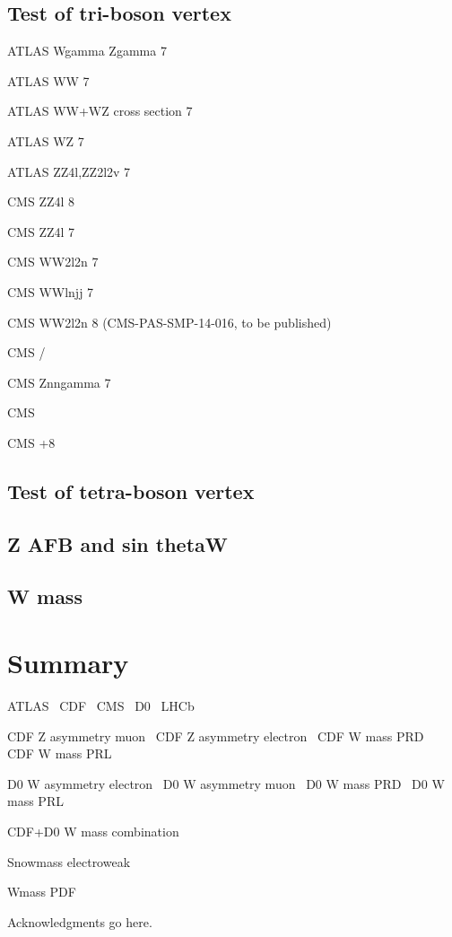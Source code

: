 \documentclass[12pt]{iopart}
\begin{document}
\subsection{Test of tri-boson vertex}

ATLAS Wgamma Zgamma 7 \TeV~\cite{Aad:2013izg}

ATLAS WW 7 \TeV~\cite{ATLAS:2012mec}

ATLAS WW+WZ cross section 7 \TeV~\cite{Aad:2014mda}

ATLAS WZ 7 \TeV~\cite{Aad:2012twa}

ATLAS ZZ4l,ZZ2l2v 7 \TeV~\cite{Aad:2012awa}

CMS ZZ4l 8 \TeV~\cite{Khachatryan:2014dia}

CMS ZZ4l 7 \TeV~\cite{Chatrchyan:2012sga}

CMS WW2l2n 7 \TeV~\cite{Chatrchyan:2013yaa}

CMS WWlnjj 7 \TeV~\cite{Chatrchyan:2012bd}

CMS WW2l2n 8 \TeV (CMS-PAS-SMP-14-016, to be published)

CMS \Wg/ \TeV~\cite{Chatrchyan:2013fya}

CMS Znngamma 7 \TeV~\cite{Chatrchyan:2013nda}

CMS  \TeV~\cite{Khachatryan:2015kea}

CMS +8 \TeV~\cite{Khachatryan:2015pba}

\subsection{Test of tetra-boson vertex}


\subsection{Z AFB and sin thetaW}


\subsection{W mass}

\section{Summary}


ATLAS~\cite{Aad:2008zzm}
CDF~\cite{Abulencia:2005ix}
CMS~\cite{CMSdetector}
D0~\cite{Abazov:2005pn}
LHCb~\cite{Alves:2008zz}

CDF Z asymmetry muon~\cite{Aaltonen:2014loa}
CDF Z asymmetry electron~\cite{Aaltonen:2013wcp}
CDF W mass PRD~\cite{Aaltonen:2013vwa}
CDF W mass PRL~\cite{Aaltonen:2012bp}

D0 W asymmetry electron~\cite{Abazov:2013dsa}
D0 W asymmetry muon~\cite{Abazov:2013rja}
D0 W mass PRD~\cite{D0:2013jba}
D0 W mass PRL~\cite{Abazov:2012bv}

CDF+D0 W mass combination~\cite{Aaltonen:2013iut}

Snowmass electroweak~\cite{Baak:2013fwa}

Wmass PDF~\cite{Bozzi:2011ww}

\ack
Acknowledgments go here.



\end{document}
